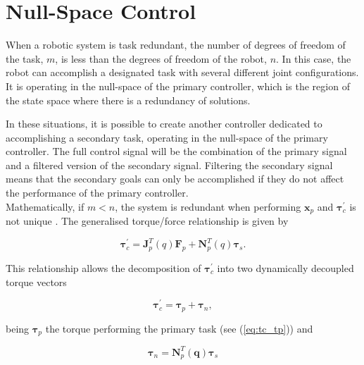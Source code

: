 
\section{Null-Space Control}
\label{sec:control_architectures_nullspace_control}

When a robotic system is task redundant, the number of degrees of freedom of the task, $m$, is less than the degrees of freedom of the robot, $n$. In this case, the robot can accomplish a designated task with several different joint configurations. It is operating in the null-space of the primary controller, which is the region of the state space where there is a redundancy of solutions.

In these situations, it is possible to create another controller dedicated to accomplishing a secondary task, operating in the null-space of the primary controller. The full control signal will be the combination of the primary signal and a filtered version of the secondary signal. Filtering the secondary signal means that the secondary goals can only be accomplished if they do not affect the performance of the primary controller.\\

Mathematically, if $m < n$, the system is redundant when performing $\boldsymbol{x}_p$ and $\boldsymbol{\tau}^\prime_c$ is not unique \cite{Santos2018_computed_torque_control_robotic_assisted_tele_ecography}. The generalised torque/force relationship is given by

\begin{equation}
    \label{eq:null_space_tau_prime_c}
    \boldsymbol{\tau}^\prime_c = \boldsymbol{J}^T_p(q) \boldsymbol{F}_p + \boldsymbol{N}^T_p(q) \boldsymbol{\tau}_s.
\end{equation}

This relationship allows the decomposition of $\boldsymbol{\tau}^\prime_c$ into two
dynamically decoupled torque vectors 

\begin{equation}
    \boldsymbol{\tau}^\prime_c = \boldsymbol{\tau}_p + \boldsymbol{\tau}_n,
\end{equation}

being $\boldsymbol{\tau}_p$ the torque performing the primary task (see (\ref{eq:tc_tp})) and

\begin{equation}
    \boldsymbol{\tau}_n = \boldsymbol{N}^T_p(\boldsymbol{q}) \boldsymbol{\tau}_s
\end{equation}


